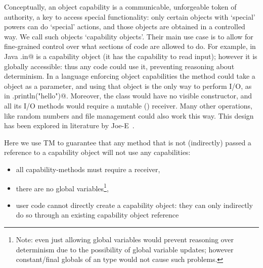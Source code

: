 Conceptually, an object capability is a communicable, unforgeable token of authority, a key to access special functionality: only certain objects with `special' powers can do `special' actions, and those objects are obtained in a controlled way. We call such objects `capability objects'.
Their main use case is to allow for fine-grained control over what sections of code are allowed to do. For example, in Java \Q@System.in@ is a capability object (it has the capability to read input); however it is globally accessible: thus any code could use it, preventing reasoning about determinism.
In a language enforcing object capabilities the \Q@main@ method could take a \Q@System@ object as a parameter, and using that object is the only way to perform I/O, as in \Q@mySystem.println("hello")@.
Moreover, the \Q@System@ class would have no visible constructor, and all its I/O methods would require a mutable (\Q@mut@) receiver.
Many other operations, like random numbers and file management 
could also work this way.
\noindent This design has been explored in literature by Joe-E~\cite{finifter2008verifiable}.

Here we use TM to guarantee that any method that is not (indirectly) passed a \Q@mut@ reference to a capability object will not use any capabilities:
\begin{itemize}
\item all capability-methods must require a \Q@mut@ receiver,
\item there are no global variables\footnote{Note: even just allowing \Q@imm@
global variables would prevent reasoning over determinism due to the possibility of global variable updates; however constant/final globals of an \Q@imm@ type would not cause such problems.},
\item user code cannot directly create a capability object: they can only indirectly do so through an existing \Q@mut@ capability object reference

\end{itemize}






